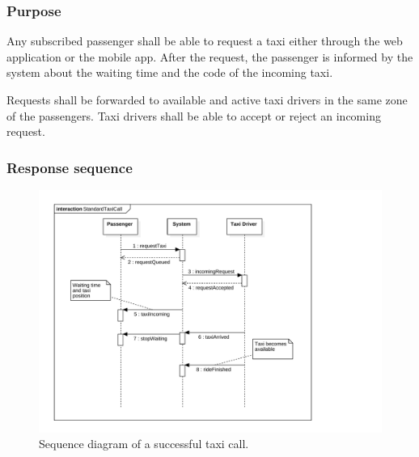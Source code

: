 \label{standard-call}
\subsubsection{Purpose}

Any subscribed passenger shall be able to request a taxi either through the web application or the mobile app.
After the request, the passenger is informed by the system about the waiting time and the code of the incoming taxi.

Requests shall be forwarded to available and active taxi drivers in the same zone of the passengers. Taxi drivers shall be able to accept or reject an incoming request.

\subsubsection{Response sequence}
\begin{figure}[h]
\includegraphics[width=\textwidth]{diagrams/sequence_taxicall.pdf}
\caption{Sequence diagram of a successful taxi call.}
\end{figure}

